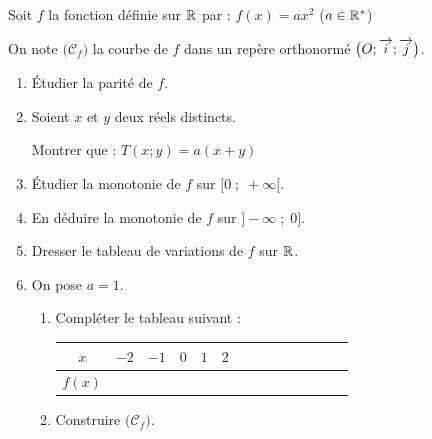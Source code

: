 \documentclass[10pt, a4paper]{article}
\begin{document}
\begin{Activite}[][20 min]
Soit $f$ la fonction définie sur $\mathbb{R}$ par : $f(x) = ax^2$ \quad ($a \in \mathbb{R}^*$)

On note $\big(\mathcal{C}_f\big)$ la courbe de $f$ dans un repère orthonormé $\big(O; \overrightarrow{i}; \overrightarrow{j}\big)$.
\begin{enumerate}[leftmargin=*,itemsep=0.5pt]
    \item Étudier la parité de $f$.
    \item Soient $x$ et $y$ deux réels distincts.

    Montrer que : \quad $T(x;y) = a(x+y) $
    \item Étudier la monotonie de $f$ sur $\big[0 \;;\; +\infty\big[$.
    \item En déduire la monotonie de $f$ sur $\big]-\infty \;;\; 0\big]$.
    \item Dresser le tableau de variations de $f$ sur $\mathbb{R}$.
    \item On pose $a=1$.
    \begin{enumerate}[leftmargin=*,itemsep=0.5pt]
        \item Compléter le tableau suivant :
        \vspace{0.1cm}
         \begin{center}
            \renewcommand{\arraystretch}{1.2}
            \begin{tabular}{|Sc|*{6}{Sc|}}
                \hline
                $x$    & $-2$ & $-1$ & $0$ & $1$ & $2$  \\ \hline
                $f(x)$ &       &       &     &   &    \\
                \hline
            \end{tabular}
        \end{center}
        \vspace{0.1cm}
        \item Construire $\big(\mathcal{C}_f\big)$.
    \end{enumerate}
\end{enumerate}
\end{Activite}
\end{document}
